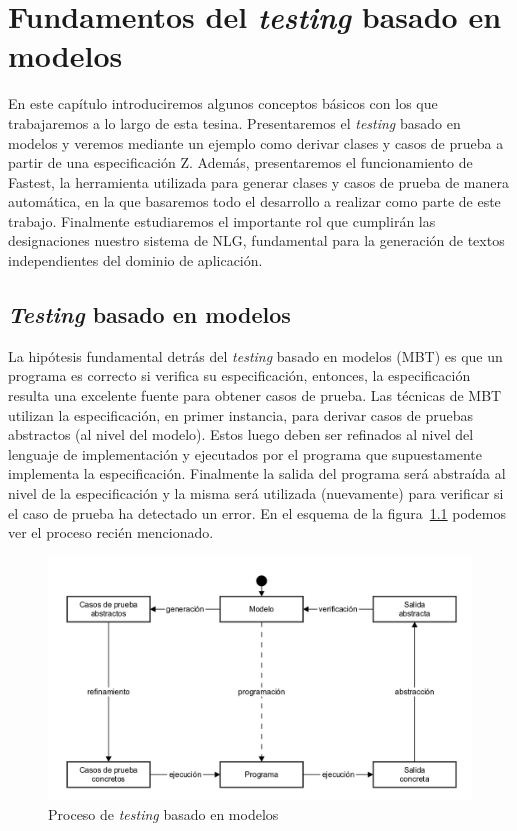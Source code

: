 \chapter[\textit{Testing} Basado en Modelos]{Fundamentos del \textit{testing} basado en modelos}
\label{cap:fundamentos}

En este capítulo introduciremos algunos conceptos básicos con los que trabajaremos a lo largo de esta tesina. Presentaremos el \textit{testing} basado en modelos y veremos mediante un ejemplo como derivar clases y casos de prueba a partir de una especificación Z. Además, presentaremos el funcionamiento de Fastest, la herramienta utilizada para generar clases y casos de prueba de manera automática, en la que basaremos todo el desarrollo a realizar como parte de este trabajo. Finalmente estudiaremos el importante rol que cumplirán las designaciones nuestro sistema de NLG, fundamental para la generación de textos independientes del dominio de aplicación.

\section{\textit{Testing} basado en modelos}

La hipótesis fundamental detrás del \textit{testing} basado en modelos (MBT) es que un programa es correcto si verifica su especificación, entonces, la especificación resulta una excelente fuente para obtener casos de prueba. Las técnicas de MBT utilizan la especificación, en primer instancia, para derivar casos de pruebas abstractos (al nivel del modelo). Estos luego deben ser refinados al nivel del lenguaje de implementación y ejecutados por el programa que supuestamente implementa la especificación. Finalmente la salida del programa será abstraída al nivel de la especificación y la misma será utilizada (nuevamente) para verificar si el caso de prueba ha detectado un error. En el esquema de la figura~\ref{fig:proc_mbt} podemos ver el proceso recién mencionado.

\begin{figure}[H]
\begin{center}
\includegraphics[scale=0.25]{img/proc_mbt.png}
\caption{Proceso de \textit{testing} basado en modelos}
\label{fig:proc_mbt}
\end{center}
\end{figure}


